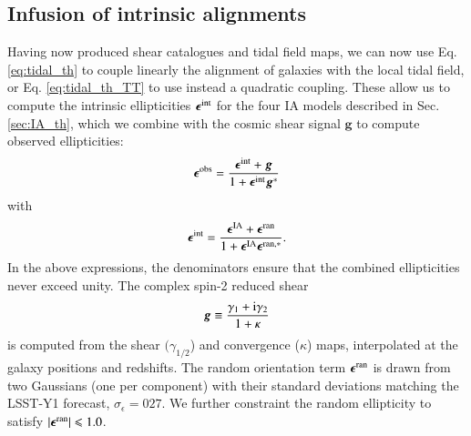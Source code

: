 \subsection{Infusion of intrinsic alignments}
\label{subsec:IA_infusion}

Having now produced shear catalogues and tidal field maps, we can now use Eq. \ref{eq:tidal_th} to couple linearly the alignment of galaxies with the local tidal field, or Eq. \ref{eq:tidal_th_TT} to use instead a quadratic coupling. These allow us to compute the intrinsic ellipticities ${\boldsymbol \epsilon}^{\rm int}$ for the four IA models described in Sec. \ref{sec:IA_th}, which we combine with the cosmic shear signal ${\boldsymbol g}$ to compute observed ellipticities: 
\begin{equation}
{\boldsymbol \epsilon}^{\rm obs} = \frac{{\boldsymbol \epsilon}^{\rm int} + {\boldsymbol g}}{1 + {\boldsymbol \epsilon}^{\rm int}{\boldsymbol g^*}} 
\label{eq:eps_obs}
\end{equation}
with
\begin{equation}
{\boldsymbol \epsilon}^{\rm int}  = \frac{{\boldsymbol \epsilon}^{\rm IA} + {\boldsymbol \epsilon}^{\rm ran}}{1 + {\boldsymbol \epsilon}^{\rm IA}{\boldsymbol \epsilon^{\rm ran, *}}}.
\label{eq:eps_int}
\end{equation}
In the above expressions, the denominators ensure that the combined  ellipticities never exceed unity.
The complex spin-2 reduced shear
\begin{equation}
{\boldsymbol g} \equiv \frac{\gamma_1 + {\rm i} \gamma_2}{1 + \kappa}
\end{equation}
is computed from the shear  $(\gamma_{1/2}$) and convergence ($\kappa$) maps, interpolated at the galaxy positions and redshifts. 
The random orientation term ${\boldsymbol \epsilon}^{\rm ran}$ is drawn from two Gaussians (one per component) with their standard deviations matching the LSST-Y1 forecast, $\sigma_{\epsilon} = 027$. We further constraint  the random ellipticity to satisfy $|{\boldsymbol \epsilon}^{\rm ran}| \le 1.0$. 

